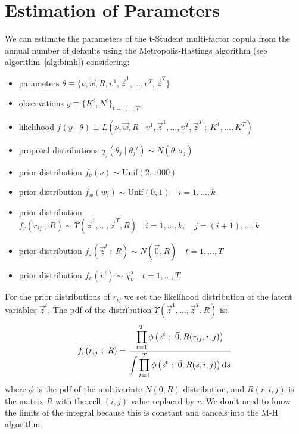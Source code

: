 \documentclass[11pt,fleqn]{book} %
\begin{document}
\section{Estimation of Parameters}

\begin{proposition}
	\label{prop:pemh}
	We can estimate the parameters of the t-Student multi-factor copula from 
	the annual number of defaults using the Metropolis-Hastings algorithm (see 
	algorithm~\ref{alg:bimh}) considering:
	\begin{itemize}
		\item parameters $\theta \equiv \{ \nu,\vec{w},R,\upsilon^1,\vec{z}^1,\dots,\upsilon^T,\vec{z}^T\}$
		\item observations $y \equiv \{K^t, N^t\}_{t=1,\dots,T}$
		\item likelihood $f(y \mid \theta) \equiv L(\nu,\vec{w},R  \mid  \upsilon^1,\vec{z}^1,\dots,\upsilon^T,\vec{z}^T\ ;\ K^1,\dots,K^T)$
		\item proposal distributions $q_j(\theta_j \mid \theta_j') \sim N(\theta,\sigma_j)$
		\item prior distribution $f_{\nu}(\nu) \sim \text{Unif}(2,1000)$
		\item prior distribution $f_{w}(w_i) \sim \text{Unif}(0,1) \quad i=1,\dots,k$
		\item prior distribution $f_{r}(r_{ij}\ ;\ R) \sim \Upsilon(\vec{z}^1,\dots,\vec{z}^T,R) \quad i=1,\dots,k, \quad j=(i+1),\dots,k$
		\item prior distribution $f_z(\vec{z}^t\ ;\ R) \sim N(\vec{0},R) \quad t=1,\dots,T$
		\item prior distribution $f_\upsilon(\upsilon^t) \sim \chi_{\nu}^2 \quad t=1,\dots,T$
	\end{itemize}
	For the prior distributions of $r_{ij}$ we set the likelihood distribution
	of the latent variables $\vec{z}^t$. The pdf of the distribution 
	$\Upsilon(\vec{z}^1,\dots,\vec{z}^T,R)$ is:
	\begin{displaymath}
		f_r(r_{ij}\ ;\ R) = \frac
		{\displaystyle \prod_{t=1}^{T} \phi\left( \vec{z}^t\ ;\ \vec{0}, R(r_{ij},i,j) \right)}
		{\displaystyle \int \prod_{t=1}^{T} \phi\left( \vec{z}^t\ ;\ \vec{0}, R(s,i,j) \right) \ud s}
	\end{displaymath}
	where $\phi$ is the pdf of the multivariate $N(0,R)$ distribution,
	and $R(r,i,j)$ is the matrix $R$ with the cell $(i,j)$ value 
	replaced by $r$. We don't need to know the limits of the integral
	because this is constant and cancels into the M-H algorithm.
\end{proposition}
\end{document}
